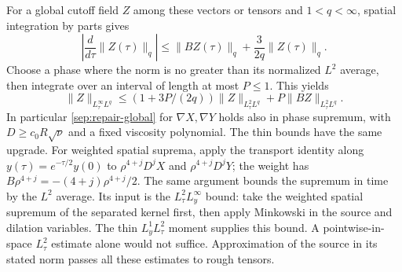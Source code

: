 For a global cutoff field $Z$ among these vectors or tensors and
$1<q<\infty$, spatial
integration by parts gives
\[
 \left|\frac{d}{d\tau}\|Z(\tau)\|_q\right|
 \le\|BZ(\tau)\|_q+\frac3{2q}\|Z(\tau)\|_q.
\]
Choose a phase where the norm is no greater than its normalized $L^2$ average,
then integrate over an interval of length at most $P\le1$. This yields
\begin{equation}\label{sep:phase-sup}
 \|Z\|_{L^\infty_\tau L^q}
 \le(1+3P/(2q))\|Z\|_{L^2_\tau L^q}
                         +P\|BZ\|_{L^2_\tau L^q}.
\end{equation}
In particular \eqref{sep:repair-global} for $\nabla X,\nabla Y$
holds also in phase supremum, with $D\ge c_0R\sqrt\nu$ and a
fixed viscosity polynomial. The thin bounds have the same upgrade.
For weighted spatial suprema, apply the transport identity along
$y(\tau)=e^{-\tau/2}y(0)$ to
$\rho^{4+j}D^jX$ and $\rho^{4+j}D^jY$; the weight has
$B\rho^{4+j}=-(4+j)\rho^{4+j}/2$. The same argument bounds the supremum in time by the $L^2$ average. Its input is the $L^2_\tau L^\infty_y$ bound:
take the weighted spatial supremum of the separated kernel first,
then apply Minkowski in the source and dilation variables. The thin
$L^1_yL^2_\tau$ moment supplies this bound. A pointwise-in-space
$L^2_\tau$ estimate alone would not suffice.
Approximation of the source in its stated norm
passes all these estimates to rough tensors.
